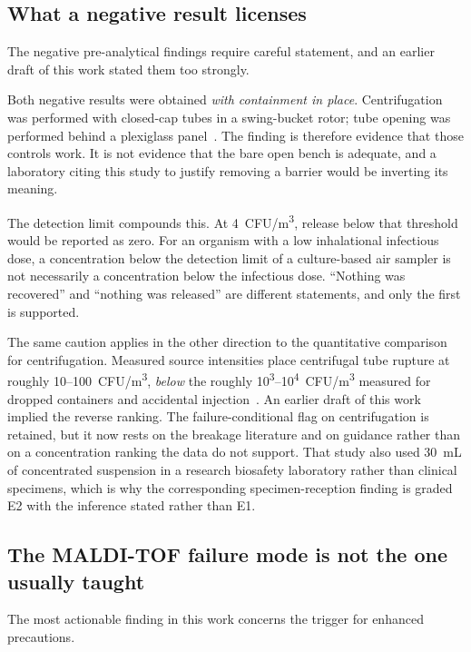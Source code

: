 \subsection{What a negative result licenses}

The negative pre-analytical findings require careful statement, and an earlier draft of
this work stated them too strongly.

Both negative results were obtained \emph{with containment in place}. Centrifugation was
performed with closed-cap tubes in a swing-bucket rotor; tube opening was performed behind
a plexiglass panel~\cite{dubuis2021}. The finding is therefore evidence that those
controls work. It is not evidence that the bare open bench is adequate, and a laboratory
citing this study to justify removing a barrier would be inverting its meaning.

The detection limit compounds this. At 4~CFU/m\textsuperscript{3}, release below that
threshold would be reported as zero. For an organism with a low inhalational infectious
dose, a concentration below the detection limit of a culture-based air sampler is not
necessarily a concentration below the infectious dose. ``Nothing was recovered'' and
``nothing was released'' are different statements, and only the first is supported.

The same caution applies in the other direction to the quantitative comparison for
centrifugation. Measured source intensities place centrifugal tube rupture at roughly
10--100~CFU/m\textsuperscript{3}, \emph{below} the roughly
10\textsuperscript{3}--10\textsuperscript{4}~CFU/m\textsuperscript{3} measured for dropped
containers and accidental injection~\cite{liu2023}. An earlier draft of this work implied
the reverse ranking. The failure-conditional flag on centrifugation is retained, but it
now rests on the breakage literature and on guidance rather than on a concentration
ranking the data do not support. That study also used 30~mL of concentrated suspension in
a research biosafety laboratory rather than clinical specimens, which is why the
corresponding specimen-reception finding is graded E2 with the inference stated rather
than E1.

\subsection{The MALDI-TOF failure mode is not the one usually taught}

The most actionable finding in this work concerns the trigger for enhanced precautions.

